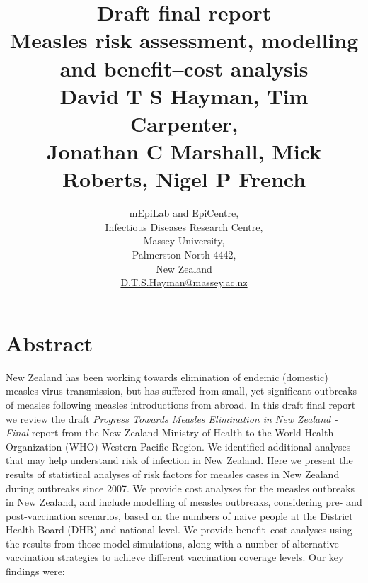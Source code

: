 \documentclass{article}
\begin{document}


\title{Draft final report\\ Measles risk assessment, modelling and benefit--cost analysis\\ \vspace{2 mm} {\large David T S Hayman, Tim Carpenter,\\ Jonathan C Marshall, Mick Roberts, Nigel P French}}
\author{mEpiLab and EpiCentre,\\ Infectious Diseases Research Centre,\\
Massey University,\\
Palmerston North 4442,\\
New Zealand\\
\href{mailto: D.T.S.Hayman@massey.ac.nz}{D.T.S.Hayman@massey.ac.nz}}  %
\maketitle

\section{Abstract}

New Zealand has been working towards elimination of endemic (domestic) measles virus transmission, but has suffered from small, yet significant outbreaks of measles following measles introductions from abroad. In this draft final report we review the draft \emph {Progress Towards Measles Elimination in New Zealand - Final} report from the New Zealand Ministry of Health to the World Health Organization (WHO) Western Pacific Region. We identified additional analyses that may help understand risk of infection in New Zealand. Here we present the results of statistical analyses of risk factors for measles cases in New Zealand during outbreaks since 2007. We provide cost analyses for the measles outbreaks in New Zealand, and include modelling of measles outbreaks, considering pre- and post-vaccination scenarios, based on the numbers of naive people at the District Health Board (DHB) and national level. We provide benefit--cost analyses using the results from those model simulations, along with a number of alternative vaccination strategies to achieve different vaccination coverage levels. Our key findings were:
\end{document}

